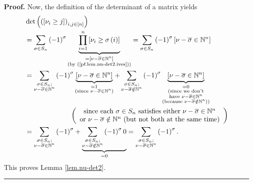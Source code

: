 \documentclass[numbers=enddot,12pt,final,onecolumn,notitlepage,english]{scrartcl}%
\theoremstyle{definition}
\newenvironment{proof}[1][Proof]{\noindent\textbf{#1.} }{\ \rule{0.5em}{0.5em}}
\let\sumnonlimits\sum
\let\prodnonlimits\prod
\renewcommand{\sum}{\sumnonlimits\limits}
\renewcommand{\prod}{\prodnonlimits\limits}
\newenvironment{verlong}{}{}
\begin{document}
\begin{verlong}
\begin{proof}
Now, the definition of the determinant of a matrix yields%
\begin{align*}
&  \det\left(  \left(  \left[  \nu_{i}\geq j\right]  \right)  _{i,j\in\left[
n\right]  }\right) \\
&  =\sum_{\sigma\in S_{n}}\left(  -1\right)  ^{\sigma}\underbrace{\prod
_{i=1}^{n}\left[  \nu_{i}\geq\sigma\left(  i\right)  \right]  }%
_{\substack{=\left[  \nu-\overline{\sigma}\in\mathbb{N}^{n}\right]
\\\text{(by (\ref{pf.lem.nu-det2.ives}))}}}=\sum_{\sigma\in S_{n}}\left(
-1\right)  ^{\sigma}\left[  \nu-\overline{\sigma}\in\mathbb{N}^{n}\right] \\
&  =\sum_{\substack{\sigma\in S_{n};\\\nu-\overline{\sigma}\in\mathbb{N}^{n}%
}}\left(  -1\right)  ^{\sigma}\underbrace{\left[  \nu-\overline{\sigma}%
\in\mathbb{N}^{n}\right]  }_{\substack{=1\\\text{(since }\nu-\overline{\sigma
}\in\mathbb{N}^{n}\text{)}}}+\sum_{\substack{\sigma\in S_{n};\\\nu
-\overline{\sigma}\notin\mathbb{N}^{n}}}\left(  -1\right)  ^{\sigma
}\underbrace{\left[  \nu-\overline{\sigma}\in\mathbb{N}^{n}\right]
}_{\substack{=0\\\text{(since we don't}\\\text{have }\nu-\overline{\sigma}%
\in\mathbb{N}^{n}\\\text{(because }\nu-\overline{\sigma}\notin\mathbb{N}%
^{n}\text{))}}}\\
&  \ \ \ \ \ \ \ \ \ \ \ \ \ \ \ \ \ \ \ \ \left(
\begin{array}
[c]{c}%
\text{since each }\sigma\in S_{n}\text{ satisfies either }\nu-\overline
{\sigma}\in\mathbb{N}^{n}\\
\text{or }\nu-\overline{\sigma}\notin\mathbb{N}^{n}\text{ (but not both at the
same time)}%
\end{array}
\right) \\
&  =\sum_{\substack{\sigma\in S_{n};\\\nu-\overline{\sigma}\in\mathbb{N}^{n}%
}}\left(  -1\right)  ^{\sigma}+\underbrace{\sum_{\substack{\sigma\in
S_{n};\\\nu-\overline{\sigma}\notin\mathbb{N}^{n}}}\left(  -1\right)
^{\sigma}0}_{=0}=\sum_{\substack{\sigma\in S_{n};\\\nu-\overline{\sigma}%
\in\mathbb{N}^{n}}}\left(  -1\right)  ^{\sigma}.
\end{align*}
This proves Lemma \ref{lem.nu-det2}.
\end{proof}
\end{verlong}
\end{document}
